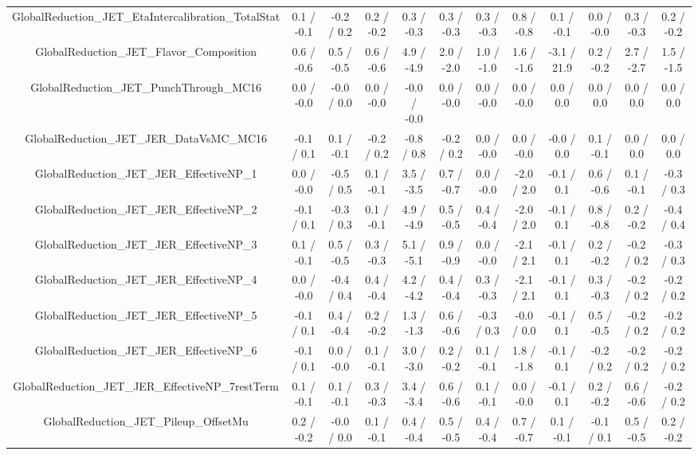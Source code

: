 \begin{table}[htbp]
\begin{center}
\begin{tabular}{|c|c|c|c|c|c|c|c|c|c|c|c|}
  GlobalReduction_JET_EtaIntercalibration_TotalStat & 0.1 / -0.1 & -0.2 / 0.2 & 0.2 / -0.2 & 0.3 / -0.3 & 0.3 / -0.3 & 0.3 / -0.3 & 0.8 / -0.8 & 0.1 / -0.1 & 0.0 / -0.0 & 0.3 / -0.3 & 0.2 / -0.2 \\ 
  GlobalReduction_JET_Flavor_Composition & 0.6 / -0.6 & 0.5 / -0.5 & 0.6 / -0.6 & 4.9 / -4.9 & 2.0 / -2.0 & 1.0 / -1.0 & 1.6 / -1.6 & -3.1 / 21.9 & 0.2 / -0.2 & 2.7 / -2.7 & 1.5 / -1.5 \\ 
  GlobalReduction_JET_PunchThrough_MC16 & 0.0 / -0.0 & -0.0 / 0.0 & 0.0 / -0.0 & -0.0 / -0.0 & 0.0 / -0.0 & 0.0 / -0.0 & 0.0 / -0.0 & 0.0 / 0.0 & 0.0 / 0.0 & 0.0 / 0.0 & 0.0 / 0.0 \\ 
  GlobalReduction_JET_JER_DataVsMC_MC16 & -0.1 / 0.1 & 0.1 / -0.1 & -0.2 / 0.2 & -0.8 / 0.8 & -0.2 / 0.2 & 0.0 / -0.0 & 0.0 / -0.0 & -0.0 / 0.0 & 0.1 / -0.1 & 0.0 / 0.0 & 0.0 / 0.0 \\ 
  GlobalReduction_JET_JER_EffectiveNP_1 & 0.0 / -0.0 & -0.5 / 0.5 & 0.1 / -0.1 & 3.5 / -3.5 & 0.7 / -0.7 & 0.0 / -0.0 & -2.0 / 2.0 & -0.1 / 0.1 & 0.6 / -0.6 & 0.1 / -0.1 & -0.3 / 0.3 \\ 
  GlobalReduction_JET_JER_EffectiveNP_2 & -0.1 / 0.1 & -0.3 / 0.3 & 0.1 / -0.1 & 4.9 / -4.9 & 0.5 / -0.5 & 0.4 / -0.4 & -2.0 / 2.0 & -0.1 / 0.1 & 0.8 / -0.8 & 0.2 / -0.2 & -0.4 / 0.4 \\ 
  GlobalReduction_JET_JER_EffectiveNP_3 & 0.1 / -0.1 & 0.5 / -0.5 & 0.3 / -0.3 & 5.1 / -5.1 & 0.9 / -0.9 & 0.0 / -0.0 & -2.1 / 2.1 & -0.1 / 0.1 & 0.2 / -0.2 & -0.2 / 0.2 & -0.3 / 0.3 \\ 
  GlobalReduction_JET_JER_EffectiveNP_4 & 0.0 / -0.0 & -0.4 / 0.4 & 0.4 / -0.4 & 4.2 / -4.2 & 0.4 / -0.4 & 0.3 / -0.3 & -2.1 / 2.1 & -0.1 / 0.1 & 0.3 / -0.3 & -0.2 / 0.2 & -0.2 / 0.2 \\ 
  GlobalReduction_JET_JER_EffectiveNP_5 & -0.1 / 0.1 & 0.4 / -0.4 & 0.2 / -0.2 & 1.3 / -1.3 & 0.6 / -0.6 & -0.3 / 0.3 & -0.0 / 0.0 & -0.1 / 0.1 & 0.5 / -0.5 & -0.2 / 0.2 & -0.2 / 0.2 \\ 
  GlobalReduction_JET_JER_EffectiveNP_6 & -0.1 / 0.1 & 0.0 / -0.0 & 0.1 / -0.1 & 3.0 / -3.0 & 0.2 / -0.2 & 0.1 / -0.1 & 1.8 / -1.8 & -0.1 / 0.1 & -0.2 / 0.2 & -0.2 / 0.2 & -0.2 / 0.2 \\ 
  GlobalReduction_JET_JER_EffectiveNP_7restTerm & 0.1 / -0.1 & 0.1 / -0.1 & 0.3 / -0.3 & 3.4 / -3.4 & 0.6 / -0.6 & 0.1 / -0.1 & 0.0 / -0.0 & -0.1 / 0.1 & 0.2 / -0.2 & 0.6 / -0.6 & -0.2 / 0.2 \\ 
  GlobalReduction_JET_Pileup_OffsetMu & 0.2 / -0.2 & -0.0 / 0.0 & 0.1 / -0.1 & 0.4 / -0.4 & 0.5 / -0.5 & 0.4 / -0.4 & 0.7 / -0.7 & 0.1 / -0.1 & -0.1 / 0.1 & 0.5 / -0.5 & 0.2 / -0.2 \\ 

\end{tabular}
\end{center}
\end{table}
